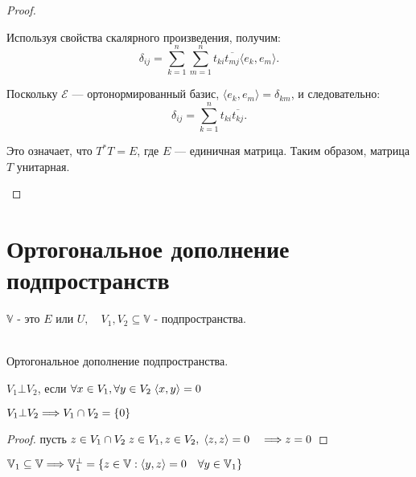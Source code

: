 \begin{proof}
\begin{enumerate}
        \quad Используя свойства скалярного произведения, получим:
        \[
        \delta_{ij} = \sum_{k=1}^n \sum_{m=1}^n t_{ki} \overline{t_{mj}} \langle e_k, e_m \rangle.
        \]
        \nl
        
        \quad Поскольку \( \mathcal{E} \) — ортонормированный базис, \( \langle e_k, e_m \rangle = \delta_{km} \), и следовательно:
        \[
        \delta_{ij} = \sum_{k=1}^n t_{ki} \overline{t_{kj}}.
        \]
        \nl
        
        \quad Это означает, что \( T^* T = E \), где \( E \) — единичная матрица. Таким образом, матрица \( T \) унитарная.
    \end{enumerate}
\end{proof}


\section{Ортогональное дополнение подпространств}

$\mathbb{V}$ - это $E$ или $U, \quad V_{1}, V_{2} \subseteq \mathbb{V}$ - подпространства.
        
\begin{shdef}
    \begin{definition}
    \leavevmode \\

        Ортогональное дополнение подпространства. 
        
        $V_{1} \bot V_{2}$, если $\forall x \in V_{1}, \forall y \in V_{2} \; \langle x, y \rangle = 0$
    \end{definition}
\end{shdef}

\begin{shth}
    \begin{theorem}
        $V_{1} \bot V_{2} \Longrightarrow V_{1} \cap V_{2} = \{0\}$
    \end{theorem}
\end{shth}

\begin{proof}
    \leavevmode \nl
    
    пусть $z \in V_{1} \cap V_{2} \; z \in V_{1}, z \in V_{2}, \; \langle z, z \rangle = 0 \quad \Longrightarrow z = 0$
\end{proof}

\begin{shdef}
    \begin{definition}
        $\mathbb{V}_{1} \subseteq \mathbb{V} \Longrightarrow \mathbb{V}_{1}^\bot = \{ z \in \mathbb{V}: \langle y, z \rangle = 0 \quad \forall y \in \mathbb{V}_{1} \}$
    \end{definition}
\end{shdef}

